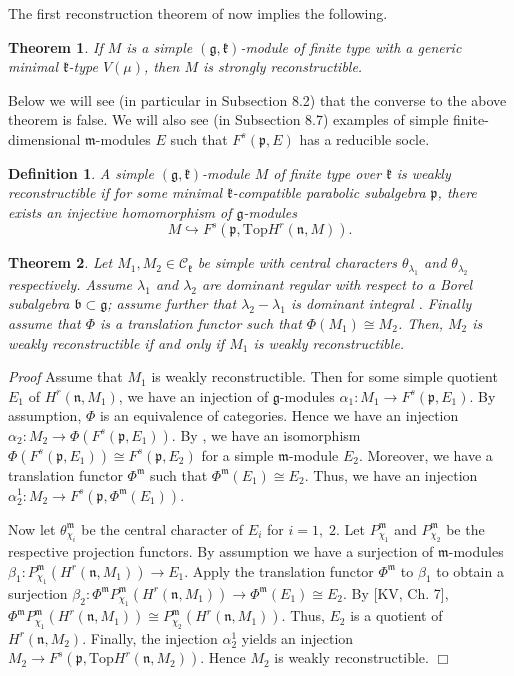 \documentclass[11pt]{amsart}
\newcounter{theorem}
\newtheorem{theo}{Theorem}[section]
\renewenvironment{proof}{ \emph{Proof}}{$\Box$}
\newtheorem{defi}{Definition}[section]
\newcommand{\kk}{\mathfrak{k}}
\newcommand{\nn}{\mathfrak{n}}
\newcommand{\mm}{\mathfrak{m}}
\newcommand{\pp}{\mathfrak{p}}
\renewcommand{\gg}{\mathfrak{g}}
\newcommand{\bb}{\mathfrak{b}}
\renewcommand{\Top}{\mathrm{Top}}
\begin{document}
The first reconstruction theorem of \cite{PZ2} now implies the following.
\begin{theo}
If $M$ is a simple $(\gg,\kk)$-module of finite type with a generic minimal $\kk$-type $V(\mu)$, then $M$ is strongly reconstructible. 
\end{theo}

Below we will see (in particular in Subsection 8.2) that the converse to the above theorem is false. We will also see (in Subsection 8.7) examples of simple finite-dimensional $\mm$-modules $E$ such that $F^s(\pp,E)$ has a reducible socle. 
\begin{defi}
A simple $(\gg,\kk)$-module $M$ of finite type over $\kk$ is weakly reconstructible if for some minimal $\kk$-compatible parabolic subalgebra $\pp$, there exists an injective homomorphism of $\gg$-modules 
\[
M\hookrightarrow F^s(\pp,\Top H^r(\nn,M)).
\]
\end{defi}
\begin{theo}
Let $M_1,M_2\in\mathcal{C}_{\kk}$ be simple with central characters $\theta_{\lambda_1}$ and $\theta_{\lambda_2}$ respectively. Assume $\lambda_1$ and $\lambda_2$ are dominant regular with respect to a Borel subalgebra $\bb\subset\gg$; assume further that $\lambda_{2}-\lambda_{1}$ is dominant integral . Finally assume that $\Phi$ is a translation functor such that $\Phi(M_1)\cong M_2$. Then, $M_2$ is weakly reconstructible if and only if $M_1$ is weakly reconstructible.
\end{theo}
\begin{proof}
Assume that $M_1$ is weakly reconstructible. Then for some simple quotient $E_1$ of $H^r(\nn,M_1)$, we have an injection of $\gg$-modules $\alpha_1 :M_1\rightarrow F^s(\pp,E_1)$. By assumption, $\Phi$ is an equivalence of categories. Hence we have an injection $\alpha_2 :M_2\rightarrow \Phi (F^s(\pp,E_1))$. By \cite{Z}, we have an isomorphism $\Phi (F^s(\pp,E_1))\cong F^s(\pp,E_2)$ for a simple $\mm$-module $E_2$. Moreover, we have a translation functor $\Phi^\mm$ such that $\Phi^\mm (E_1)\cong E_2$. Thus, we have an injection $\alpha_2^1 :M_2\rightarrow F^s(\pp,\Phi^\mm (E_1))$.

Now let $\theta^\mm_{\chi_i}$ be the central character of  $E_i$ for $i=1,\; 2$. Let $P_{\chi_1}^\mm$ and $P_{\chi_2}^\mm$ be the respective projection functors. By assumption we have a surjection  of $\mm$-modules $\beta_1:P_{\chi_1}^\mm (H^r(\nn,M_1))\rightarrow E_1$. Apply the translation functor $\Phi^\mm$ to $\beta_1$ to obtain a surjection $\beta_2:\Phi^\mm P_{\chi_1}^\mm (H^r(\nn,M_1))\rightarrow \Phi^\mm (E_1)\cong E_2$. By [KV, Ch. 7], $\Phi^\mm P_{\chi_1}^\mm (H^r(\nn,M_1))\cong P_{\chi_2}^\mm (H^r(\nn,M_1))$. Thus, $E_2$ is a quotient of $H^r(\nn,M_2)$. Finally, the injection $\alpha_2^1$ yields an injection $M_2\rightarrow F^s(\pp, \Top H^r(\nn,M_2))$. Hence $M_2$ is weakly reconstructible.
\end{proof}
\end{document}
